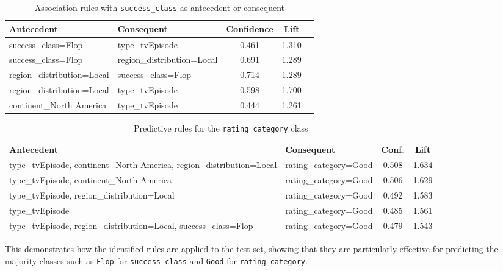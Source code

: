 \documentclass[10pt]{article}
\begin{document}
\begin{table}[htbp]
\centering
\caption{Association rules with \texttt{success\_class} as antecedent or consequent}
\label{tab:flop_rules}
\begin{tabular}{|p{5cm}|p{4.5cm}|c|c|c|}
\hline
\textbf{Antecedent} & \textbf{Consequent} & \textbf{Confidence} & \textbf{Lift} \\
\hline
success\_class=Flop & type\_tvEpisode & 0.461 & 1.310  \\
\hline
success\_class=Flop & region\_distribution=Local & 0.691 & 1.289 \\
\hline
region\_distribution=Local & success\_class=Flop & 0.714 & 1.289  \\
\hline
region\_distribution=Local & type\_tvEpisode & 0.598 & 1.700  \\
\hline
continent\_North America & type\_tvEpisode & 0.444 & 1.261 \\
\hline
\end{tabular}
\end{table}

\begin{table}[htbp]
\centering
\caption{Predictive rules for the \texttt{rating\_category} class}
\label{tab:rating_good_rules}
\begin{tabular}{|p{6.5cm}|p{3.5cm}|c|c|}
\hline
\textbf{Antecedent} & \textbf{Consequent} & \textbf{Conf.} & \textbf{Lift} \\
\hline
type\_tvEpisode, continent\_North America, region\_distribution=Local & rating\_category=Good & 0.508 & 1.634 \\
\hline
type\_tvEpisode, continent\_North America & rating\_category=Good & 0.506 & 1.629 \\
\hline
type\_tvEpisode, region\_distribution=Local & rating\_category=Good & 0.492 & 1.583 \\
\hline
type\_tvEpisode & rating\_category=Good & 0.485 & 1.561 \\
\hline
type\_tvEpisode, \newline region\_distribution=Local, \newline success\_class=Flop & rating\_category=Good & 0.479 & 1.543 \\
\hline
\end{tabular}
\end{table}

This demonstrates how the identified rules are applied to the test set, showing that they are particularly effective for predicting the majority classes such as \texttt{Flop} for \texttt{success\_class} and \texttt{Good} for \texttt{rating\_category}.
\end{document}

